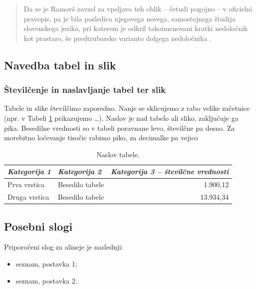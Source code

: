 \documentclass{article}
\begin{document}
\begin{quote}
Da se je Ramovš zavzel za vpeljavo teh oblik – četudi pogojno – v oficielni pravopis, pa je bila posledica njegovega novega, samostojnega študija slovenskega jezika, pri katerem je odkril takoimenovani kratki nedoločnik kot prastaro, še predtrubarsko varianto dolgega nedoločnika \cite[str.~198]{vodusek1959}.
\end{quote}

\subsection{Navedba tabel in slik}
\subsubsection{Številčenje in naslavljanje tabel ter slik}
Tabele in slike številčimo zaporedno. Nanje se sklicujemo z rabo velike začetnice (npr. v Tabeli \ref{slogi} prikazujemo …). Naslov je nad tabelo ali sliko, zaključuje ga pika. Besedilne vrednosti so v tabeli poravnane levo, številčne pa desno. Za morebitno ločevanje tisočic rabimo piko, za decimalke pa vejico

\begin{table}[h]
\caption{Naslov tabele.}
\label{slogi}
\begin{tabularx}{\textwidth}{X|X|r}
\toprule
\textit{Kategorija 1} & \textit{Kategorija 2} & \textit{Kategorija 3 –   številčne vrednosti} \\ \midrule
Prva vrstica          & Besedilo tabele       & 1.900,12                                      \\
Druga vrstica         & Besedilo tabele       & 13.934,34                                     \\ \bottomrule
\end{tabularx}
\end{table}

\subsection{Posebni slogi}
Priporočeni slog za alineje je naslednji:
\begin{itemize}
    \item seznam, postavka 1;
    \item seznam, postavka 2.
\end{itemize}




\end{document}
